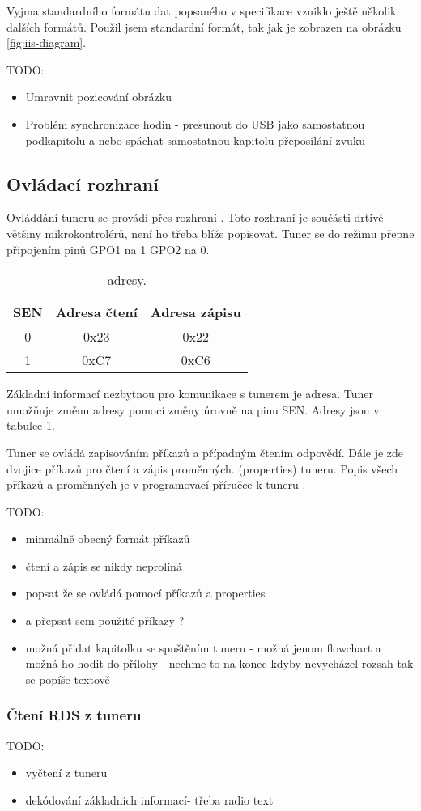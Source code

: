 
Vyjma standardního formátu dat popsaného v \iis specifikace \cite{iis} vzniklo ještě několik dalších formátů. Použil jsem standardní formát, tak jak je zobrazen na obrázku \ref{fig:iis-diagram}.

TODO:
\begin{itemize}
\item Umravnit pozicování obrázku
\item Problém synchronizace hodin - presunout do USB jako samostatnou podkapitolu a nebo spáchat samostatnou kapitolu přeposílání zvuku
\end{itemize}


\subsection{Ovládací rozhraní \iic}
Ovláddání tuneru se provádí přes rozhraní \iic. Toto rozhraní je součásti drtivé většiny mikrokontrolérů, není ho třeba blíže popisovat. Tuner se do režimu \iic přepne připojením pinů GPO1 na 1 GPO2 na 0.

\begin{table}[ht!]
\begin{center}
\begin{tabular}{|c|c|c|}
\hline 
SEN & Adresa čtení & Adresa zápisu  \\ 
\hline 
0 & 0x23 & 0x22 \\ 
\hline 
1 & 0xC7 & 0xC6 \\ 
\hline 
\end{tabular}
\end{center}
\caption{\iic adresy.}
\label{tab:iic_addresses} 
\end{table}

Základní informací nezbytnou pro komunikace s tunerem je \iic adresa. Tuner umožňuje změnu adresy pomocí změny úrovně na pinu SEN. Adresy jsou v tabulce \ref{tab:iic_addresses}.

Tuner se ovládá zapisováním příkazů a případným čtením odpovědí. Dále je zde dvojice příkazů pro čtení a zápis proměnných. (properties) tuneru. Popis všech příkazů a proměnných je v programovací příručce k tuneru \cite{tuner-programing}.


TODO:
\begin{itemize}
\item minmálně obecný formát příkazů
\item čtení a zápis se nikdy neprolíná
\item popsat že se ovládá pomocí příkazů a properties
\item a přepsat sem použité příkazy ?
\item možná přidat kapitolku se spuštěním tuneru - možná jenom flowchart a možná ho hodit do přílohy - nechme to na konec kdyby nevycházel rozsah tak se popíše textově
\end{itemize}


\subsubsection{Čtení RDS z tuneru}
TODO:
\begin{itemize}
\item vyčtení z tuneru
\item dekódování základních informací- třeba radio text
\end{itemize}